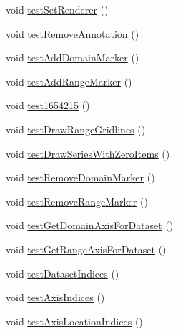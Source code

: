 \begin{DoxyCompactItemize}
\item 
void \mbox{\hyperlink{classorg_1_1jfree_1_1chart_1_1plot_1_1_x_y_plot_test_aa79ceee951f6869ee48e26c538a26636}{test\+Set\+Renderer}} ()
\item 
void \mbox{\hyperlink{classorg_1_1jfree_1_1chart_1_1plot_1_1_x_y_plot_test_ad8491da997f56d671a56c921ae379147}{test\+Remove\+Annotation}} ()
\item 
void \mbox{\hyperlink{classorg_1_1jfree_1_1chart_1_1plot_1_1_x_y_plot_test_a7610a0425ea59f7f20082422cbb60774}{test\+Add\+Domain\+Marker}} ()
\item 
void \mbox{\hyperlink{classorg_1_1jfree_1_1chart_1_1plot_1_1_x_y_plot_test_ae0ea2d220d1a1bcae815c559fbfb8924}{test\+Add\+Range\+Marker}} ()
\item 
void \mbox{\hyperlink{classorg_1_1jfree_1_1chart_1_1plot_1_1_x_y_plot_test_a792db35265fd558bfa5a6b2f47dd4c7c}{test1654215}} ()
\item 
void \mbox{\hyperlink{classorg_1_1jfree_1_1chart_1_1plot_1_1_x_y_plot_test_ad21b311e2ad0e7982a7056ea85344c85}{test\+Draw\+Range\+Gridlines}} ()
\item 
void \mbox{\hyperlink{classorg_1_1jfree_1_1chart_1_1plot_1_1_x_y_plot_test_a2af383f219adea345864adf2eb78e712}{test\+Draw\+Series\+With\+Zero\+Items}} ()
\item 
void \mbox{\hyperlink{classorg_1_1jfree_1_1chart_1_1plot_1_1_x_y_plot_test_ab67544e2d793e7c0305843060c145164}{test\+Remove\+Domain\+Marker}} ()
\item 
void \mbox{\hyperlink{classorg_1_1jfree_1_1chart_1_1plot_1_1_x_y_plot_test_a650ddff3501f24a6877a168e3765ebf7}{test\+Remove\+Range\+Marker}} ()
\item 
void \mbox{\hyperlink{classorg_1_1jfree_1_1chart_1_1plot_1_1_x_y_plot_test_a0c5e0edf0e2f7a11c35b460757ab225b}{test\+Get\+Domain\+Axis\+For\+Dataset}} ()
\item 
void \mbox{\hyperlink{classorg_1_1jfree_1_1chart_1_1plot_1_1_x_y_plot_test_a48c3fbb2bac5ec644dad6fdc2b194d51}{test\+Get\+Range\+Axis\+For\+Dataset}} ()
\item 
void \mbox{\hyperlink{classorg_1_1jfree_1_1chart_1_1plot_1_1_x_y_plot_test_a250a0840e70067bae4599d6a67ba59d4}{test\+Dataset\+Indices}} ()
\item 
void \mbox{\hyperlink{classorg_1_1jfree_1_1chart_1_1plot_1_1_x_y_plot_test_a1d4fa1c0e55f4156234d48f66f16a2b8}{test\+Axis\+Indices}} ()
\item 
void \mbox{\hyperlink{classorg_1_1jfree_1_1chart_1_1plot_1_1_x_y_plot_test_a81749d40dbb9e5ad765a75972854ea5c}{test\+Axis\+Location\+Indices}} ()

\end{DoxyCompactItemize}
